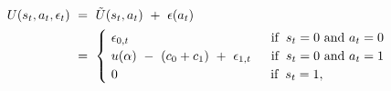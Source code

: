 \begin{equation}
\begin{split}
     U(s_{t}, a_{t}, \epsilon_{t}) \ 
     & = \ \tilde{U}(s_{t}, a_{t}) \ + \ \epsilon(a_{t}) \\
     & = \ 
     \begin{cases}
          \ \epsilon_{0,t} \hspace{3.9cm} \text{if} \hspace{0.2cm} s_{t} = 0 \text{ and } a_{t} = 0 \\
          \ u(\alpha) \ - \ (c_{0} + c_{1}) \ + \ \epsilon_{1,t} \hspace{0.55cm} \text{if} \hspace{0.2cm} s_{t} = 0 \text{ and } a_{t} = 1 \\ 
          \ 0 \hspace{4.2cm} \text{if} \hspace{0.2cm} s_{t} = 1,
     \end{cases}
\end{split}
\label{Equation:DCDP-Model_Utility-Function}
\end{equation}